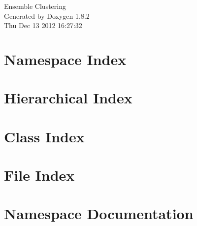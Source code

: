 \documentclass{book}
\begin{document}
\hypersetup{pageanchor=false,citecolor=blue}
\begin{titlepage}
\vspace*{7cm}
\begin{center}
{\Large Ensemble Clustering }\\
\vspace*{1cm}
{\large Generated by Doxygen 1.8.2}\\
\vspace*{0.5cm}
{\small Thu Dec 13 2012 16:27:32}\\
\end{center}
\end{titlepage}
\clearemptydoublepage
{}
\tableofcontents
\clearemptydoublepage
{}
\hypersetup{pageanchor=true,citecolor=blue}
\chapter{Namespace Index}

\chapter{Hierarchical Index}

\chapter{Class Index}

\chapter{File Index}

\chapter{Namespace Documentation}

\end{document}
